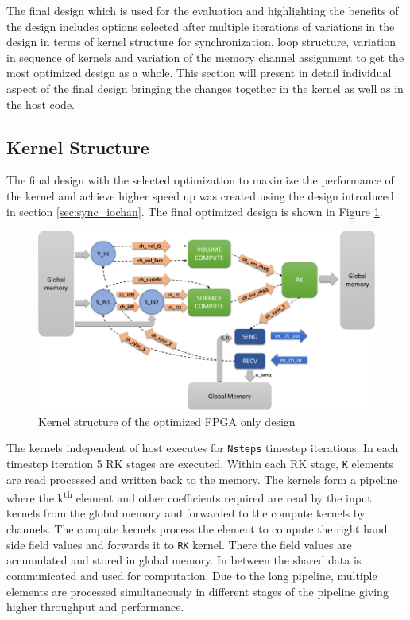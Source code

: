 The final design which is used for the evaluation and highlighting the benefits of the design includes
options selected after multiple iterations of variations in the design in terms of kernel
structure for synchronization, loop structure, variation in sequence of kernels and variation
of the memory channel assignment to get the most optimized design as a whole. This section
will present in detail individual aspect of the final design bringing the changes together
in the kernel as well as in the host code.

\subsection{Kernel Structure}

The final design with the selected optimization to maximize the performance of the kernel and achieve
higher speed up was created using the design introduced in section \ref{sec:sync_iochan}.
The final optimized design is shown in Figure \ref{fig:fpgaonly_kernstruc}.

\begin{figure}[ht]%
    \centering
    \includegraphics[width=1.0\textwidth]{images/fpgaonly_kernstruc}
    \caption{Kernel structure of the optimized FPGA only design}
    \label{fig:fpgaonly_kernstruc}
\end{figure}

The kernels independent of host executes for \texttt{Nsteps} timestep iterations.
In each timestep iteration 5 RK stages are executed. Within each RK stage, \texttt{K}
elements are read processed and written back to the memory. The kernels form a pipeline
where the k\textsuperscript{th} element and other coefficients required are read by the
input kernels from the global memory and forwarded to the compute kernels by channels.
The compute kernels process the element to compute the right hand side field values and
forwards it to \texttt{RK} kernel. There the field values are accumulated and stored in global memory.
In between the shared data is communicated and used for computation. Due to the long pipeline,
multiple elements are processed simultaneously in different stages of the pipeline giving
higher throughput and performance.

